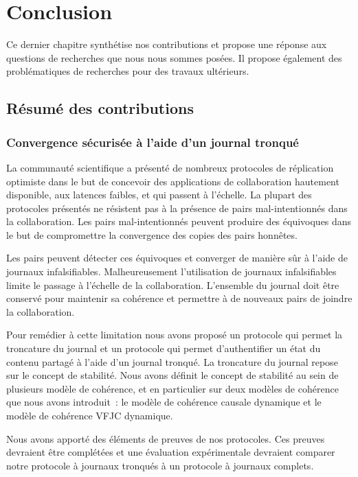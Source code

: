 
\chapter{Conclusion}\label{ch:conclusion}

\minitoc{}
\bigskip

Ce dernier chapitre synthétise nos contributions et propose une réponse aux questions de recherches que nous nous sommes posées.
Il propose également des problématiques de recherches pour des travaux ultérieurs.

\clearpage
\section{Résumé des contributions}

\subsection{Convergence sécurisée à l'aide d'un journal tronqué}

La communauté scientifique a présenté de nombreux protocoles de réplication optimiste dans le but de concevoir des applications de collaboration hautement disponible, aux latences faibles, et qui passent à l'échelle.
La plupart des protocoles présentés ne résistent pas à la présence de pairs mal-intentionnés dans la collaboration.
Les pairs mal-intentionnés peuvent produire des équivoques dans le but de compromettre la convergence des copies des pairs honnêtes.

Les pairs peuvent détecter ces équivoques et converger de manière sûr à l'aide de journaux infalsifiables.
Malheureusement l'utilisation de journaux infalsifiables limite le passage à l'échelle de la collaboration.
L'ensemble du journal doit être conservé pour maintenir sa cohérence et permettre à de nouveaux pairs de joindre la collaboration.

Pour remédier à cette limitation nous avons proposé un protocole qui permet la troncature du journal et un protocole qui permet d'authentifier un état du contenu partagé à l'aide d'un journal tronqué.
La troncature du journal repose sur le concept de stabilité.
Nous avons définit le concept de stabilité au sein de plusieurs modèle de cohérence, et en particulier sur deux modèles de cohérence que nous avons introduit~: le modèle de cohérence causale dynamique et le modèle de cohérence \acl{VFJC} dynamique.

Nous avons apporté des éléments de preuves de nos protocoles.
Ces preuves devraient être complétées et une évaluation expérimentale devraient comparer notre protocole à journaux tronqués à un protocole à journaux complets.



